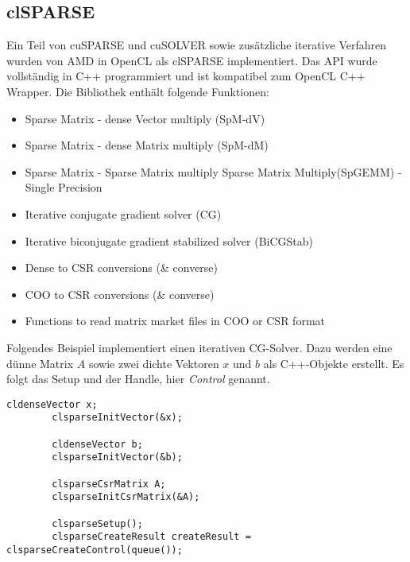 		\subsection{clSPARSE}
		Ein Teil von cuSPARSE und cuSOLVER sowie zusätzliche iterative Verfahren wurden von AMD in OpenCL als clSPARSE implementiert. Das \Gls{API} wurde vollständig in C++ programmiert und ist kompatibel zum OpenCL C++ Wrapper. Die Bibliothek enthält folgende Funktionen:
		
		\begin{itemize}				
			\item Sparse Matrix - dense Vector multiply (SpM-dV)
			\item Sparse Matrix - dense Matrix multiply (SpM-dM)
			\item Sparse Matrix - Sparse Matrix multiply Sparse Matrix Multiply(SpGEMM) - Single Precision
			\item Iterative conjugate gradient solver (CG)
			\item Iterative biconjugate gradient stabilized solver (BiCGStab)
			\item Dense to CSR conversions (\& converse)
			\item COO to CSR conversions (\& converse)
			\item Functions to read matrix market files in COO or CSR format
    	    \end{itemize}
    	
        	Folgendes Beispiel implementiert einen iterativen CG-Solver. Dazu werden eine dünne Matrix $A$ sowie zwei dichte Vektoren $x$ und $b$ als C++-Objekte erstellt. Es folgt das Setup und der \Gls{Handle}, hier \textit{Control} genannt. 
        	
        	\newpage
        	
        	\begin{lstlisting}[caption=clSPARSE: Initialisieren]
        cldenseVector x;
        clsparseInitVector(&x);
		
        cldenseVector b;
        clsparseInitVector(&b); 

        clsparseCsrMatrix A;
        clsparseInitCsrMatrix(&A); 
    	
        clsparseSetup();
        clsparseCreateResult createResult = clsparseCreateControl(queue());
        	\end{lstlisting}

